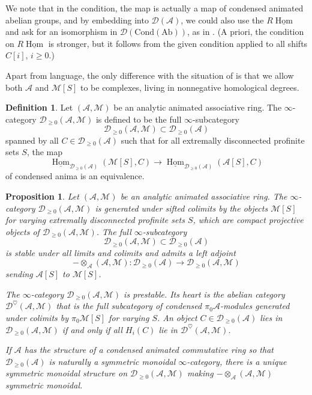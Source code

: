 \documentclass[11pt]{amsbook}
\DeclareMathOperator{\Hom}{Hom}
\newcommand{\intHom}{\underline{\Hom}}
\newcommand{\heart}{\heartsuit}
\numberwithin{equation}{section}
\numberwithin{theorem}{section}
\newtheorem{proposition}[theorem]{Proposition}
\theoremstyle{definition}
\newtheorem{definition}[theorem]{Definition}
\begin{document}
We note that in the condition, the map is actually a map of condensed animated abelian groups, and by embedding into $\mathcal D(\mathcal A)$, we could also use the $R\intHom$ and ask for an isomorphism in $\mathcal D(\mathrm{Cond}(\mathrm{Ab}))$, as in \cite[Definition 7.4]{Condensed}. (A priori, the condition on $R\intHom$ is stronger, but it follows from the given condition applied to all shifts $C[i]$, $i\geq 0$.)

Apart from language, the only difference with the situation of \cite[Definition 7.1, 7.4]{Condensed} is that we allow both $\mathcal A$ and $\mathcal M[S]$ to be complexes, living in nonnegative homological degrees.

\begin{definition} Let $(\mathcal A,\mathcal M)$ be an analytic animated associative ring. The $\infty$-category $\mathcal D_{\geq 0}(\mathcal A,\mathcal M)$ is defined to be the full $\infty$-subcategory
\[
\mathcal D_{\geq 0}(\mathcal A,\mathcal M)\subset \mathcal D_{\geq 0}(\mathcal A)
\]
spanned by all $C\in \mathcal D_{\geq 0}(\mathcal A)$ such that for all extremally disconnected profinite sets $S$, the map
\[
\intHom_{\mathcal D_{\geq 0}(\mathcal A)}(\mathcal M[S],C)\to \intHom_{\mathcal D_{\geq 0}(\mathcal A)}(\mathcal A[S],C)
\]
of condensed anima is an equivalence.
\end{definition}

\begin{proposition} Let $(\mathcal A,\mathcal M)$ be an analytic animated associative ring. The $\infty$-category $\mathcal D_{\geq 0}(\mathcal A,\mathcal M)$ is generated under sifted colimits by the objects $\mathcal M[S]$ for varying extremally disconnected profinite sets $S$, which are compact projective objects of $\mathcal D_{\geq 0}(\mathcal A,\mathcal M)$. The full $\infty$-subcategory
\[
\mathcal D_{\geq 0}(\mathcal A,\mathcal M)\subset \mathcal D_{\geq 0}(\mathcal A)
\]
is stable under all limits and colimits and admits a left adjoint
\[
-\otimes_{\mathcal A} (\mathcal A,\mathcal M): \mathcal D_{\geq 0}(\mathcal A)\to \mathcal D_{\geq 0}(\mathcal A,\mathcal M)
\]
sending $\mathcal A[S]$ to $\mathcal M[S]$.

The $\infty$-category $\mathcal D_{\geq 0}(\mathcal A,\mathcal M)$ is prestable. Its heart is the abelian category $\mathcal D^\heart(\mathcal A,\mathcal M)$ that is the full subcategory of condensed $\pi_0 \mathcal A$-modules generated under colimits by $\pi_0 \mathcal M[S]$ for varying $S$. An object $C\in \mathcal D_{\geq 0}(\mathcal A)$ lies in $\mathcal D_{\geq 0}(\mathcal A,\mathcal M)$ if and only if all $H_i(C)$ lie in $\mathcal D^\heart(\mathcal A,\mathcal M)$.

If $\mathcal A$ has the structure of a condensed animated commutative ring so that $\mathcal D_{\geq 0}(\mathcal A)$ is naturally a symmetric monoidal $\infty$-category, there is a unique symmetric monoidal structure on $\mathcal D_{\geq 0}(\mathcal A,\mathcal M)$ making $-\otimes_{\mathcal A} (\mathcal A,\mathcal M)$ symmetric monoidal.
\end{proposition}
\end{document}

